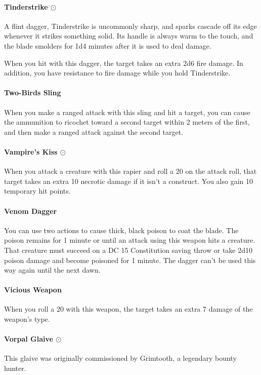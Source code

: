     \paragraph{Tinderstrike $\odot$}
        A flint dagger, Tinderstrike is uncommonly sharp, and sparks cascade off its edge whenever it strikes something solid.
        Its handle is always warm to the touch, and the blade smolders for 1d4 minutes after it is used to deal damage.

        When you hit with this dagger, the target takes an extra 2d6 fire damage.
        In addition, you have resistance to fire damage while you hold Tinderstrike.
    \paragraph{Two-Birds Sling}
        When you make a ranged attack with this sling and hit a target, you can cause the ammunition to ricochet toward a second target within 2 meters of the first, and then make a ranged attack against the second target.
    \paragraph{Vampire's Kiss $\odot$}
        When you attack a creature with this rapier and roll a 20 on the attack roll, that target takes an extra 10 necrotic damage if it isn't a construct.
        You also gain 10 temporary hit points.
    \paragraph{Venom Dagger}
        You can use two actions to cause thick, black poison to coat the blade.
        The poison remains for 1 minute or until an attack using this weapon hits a creature.
        That creature must succeed on a DC 15 Constitution saving throw or take 2d10 poison damage and become poisoned for 1 minute.
        The dagger can't be used this way again until the next dawn.
    \paragraph{Vicious Weapon}
        When you roll a 20 with this weapon, the target takes an extra 7 damage of the weapon's type.
    \paragraph{Vorpal Glaive $\odot$}
        This glaive was originally commissioned by Grimtooth, a legendary bounty hunter.

